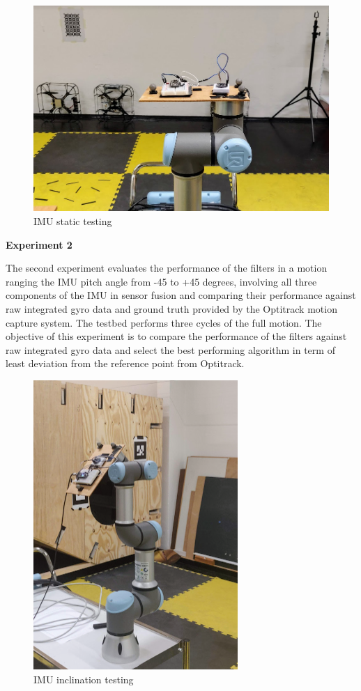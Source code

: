 \begin{figure}[h!]
    \centering
    \includegraphics[scale=0.5]{graphics/Navigation/UR_2.png}
    \caption{IMU static testing}
     \label{fig:IMU static testing}
\end{figure} 


\textbf{Experiment 2}

The second experiment evaluates the performance of the filters in a motion ranging the IMU pitch angle from -45 to +45 degrees, involving all three components of the IMU in sensor fusion and comparing their performance against raw integrated gyro data and ground truth provided by the Optitrack motion capture system. The testbed performs three cycles of the full motion.
The objective of this experiment is to compare the performance of the filters against raw integrated gyro data and select the best performing algorithm in term of least deviation from the reference point from Optitrack. 

\begin{figure}[h!]
    \centering
    \includegraphics[scale=0.9]{graphics/Navigation/UR_inclined.png}
    \caption{IMU inclination testing}
     \label{fig:IMU inclination testing}
\end{figure} 


